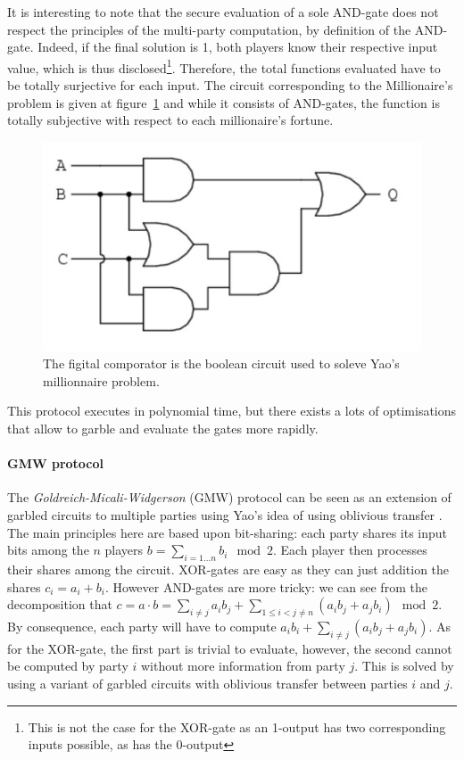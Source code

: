 It is interesting to note that the secure evaluation of a sole AND-gate does not respect the principles of the multi-party computation, by definition of the AND-gate. Indeed, if the final solution is 1, both players know their respective input value, which is thus disclosed\footnote{This is not the case for the XOR-gate as an 1-output has two corresponding inputs possible, as has the 0-output}. Therefore, the total functions evaluated have to be totally surjective for each input. The circuit corresponding to the Millionaire's problem is given at figure~\ref{privacy:yao-comp} and while it consists of AND-gates, the function is totally subjective with respect to each millionaire's fortune.

\begin{figure}[ht!]
    \centering
    \includegraphics[width=.7\textwidth]{parts/chap-3/img-3/yao-comp.jpg}
    \caption{The figital comporator is the boolean circuit used to soleve Yao's millionnaire problem.} 
    \label{privacy:yao-comp}
\end{figure}

This protocol executes in polynomial time, but there exists a lots of optimisations that allow to garble and evaluate the gates more rapidly.

\paragraph{GMW protocol}
The \emph{Goldreich-Micali-Widgerson} (GMW) protocol can be seen as an extension of garbled circuits to multiple parties using Yao's idea of using oblivious transfer \cite{Goldreich1987HowGame}. The main principles here are based upon bit-sharing: each party shares its input bits among the $n$ players $b = \sum_{i=1\ldots n}b_i \mod 2$. Each player then processes their shares among the circuit. XOR-gates are easy as they can just addition the shares $c_i = a_i + b_i$. However AND-gates are more tricky: we can see from the decomposition that $c = a \cdot b = \sum_{i\neq j}a_ib_j+\sum_{1\leq i< j\neq n}\left(a_ib_j + a_jb_i \right) \mod 2$. By consequence, each party will have to compute $a_ib_i+ \sum_{i\neq j}\left( a_ib_j + a_jb_i\right)$. As for the XOR-gate, the first part is trivial to evaluate, however, the second cannot be computed by party $i$ without more information from party $j$. This is solved by using a variant of garbled circuits with oblivious transfer between parties $i$ and $j$.

